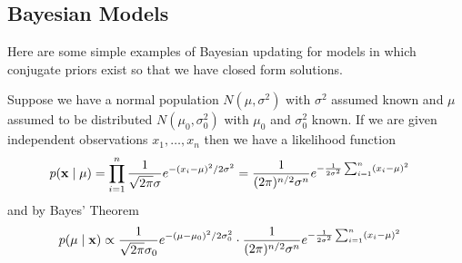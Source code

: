 \subsection{Bayesian Models}
Here are some simple examples of Bayesian updating for models in which
conjugate priors exist so that we have closed form solutions.

\begin{examp}\label{Estimating a Normal mean with know variance}
Suppose we have a normal population $N(\mu, \sigma^2)$ with $\sigma^2$
assumed known and $\mu$ assumed to be distributed $N(\mu_0,
\sigma_0^2)$ with $\mu_0$ and $\sigma_0^2$ known.  If we are given
independent observations $x_1, \dotsc, x_n$ then we have a likelihood
function 
\begin{align*}
p(\bold{x}\mid \mu) &= \prod_{i=1}^n \frac{1}{\sqrt{2 \pi} \sigma}
e^{-(x_i - \mu)^2/2\sigma^2} 
= \frac{1}{(2 \pi)^{n/2}  \sigma^n} e^{-\frac{1}{2\sigma^2} \sum_{i=1}^n (x_i - \mu)^2}
\end{align*}
and by Bayes' Theorem
\begin{align*}
p(\mu \mid \bold{x}) &\propto \frac{1}{\sqrt{2\pi}\sigma_0} e^{-(\mu -
  \mu_0)^2/2\sigma_0^2} \cdot \frac{1}{(2 \pi)^{n/2}  \sigma^n} e^{-\frac{1}{2\sigma^2} \sum_{i=1}^n (x_i - \mu)^2}
\end{align*}
\end{examp}